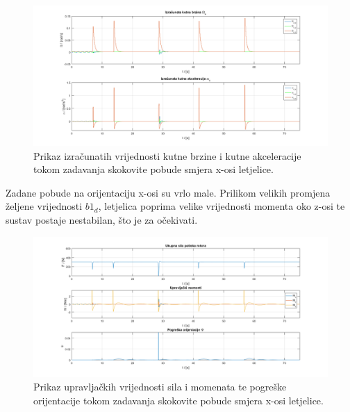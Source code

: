 \documentclass[times, utf8, diplomski]{fer}
\begin{document}
	\begin{figure}[!h]
		\includegraphics[width=\textwidth]{plots/b1d_alpha_omega2.png}
		\caption{Prikaz izračunatih vrijednosti kutne brzine i kutne  akceleracije tokom zadavanja skokovite pobude smjera x-osi letjelice.}
	\end{figure}
	
	Zadane pobude na orijentaciju x-osi su vrlo male. Prilikom velikih promjena željene vrijednosti $b1_d$, letjelica poprima velike vrijednosti momenta oko z-osi te sustav postaje nestabilan, što je za očekivati. 
	
	\newpage
	\clearpage
	
	\begin{figure}[h!]
		\includegraphics[width=\textwidth]{plots/b1d_force_moments2.png}
		\caption{Prikaz upravljačkih vrijednosti sila i momenata te pogreške orijentacije tokom zadavanja skokovite pobude smjera x-osi letjelice.}
	\end{figure}
	
\end{document}
